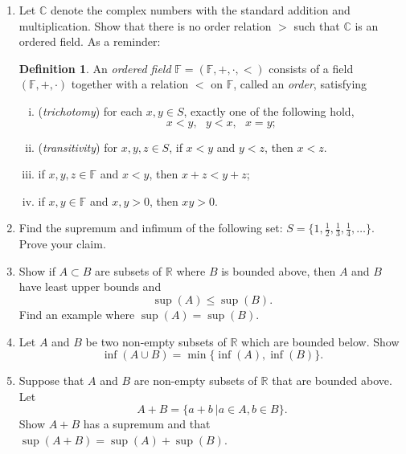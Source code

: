 \documentclass[12pt,letterpaper]{article}
\theoremstyle{plain}
\theoremstyle{definition}
\newtheorem{definition}[theorem]{Definition}
\begin{document}
\begin{enumerate}[1.]
 \item Let $\mathbb{C}$ denote the complex numbers with the standard addition and multiplication. Show that there is no order relation $>$ such that $\mathbb{C}$ is an ordered field. As a reminder:
 \begin{definition}\rm
   An {\it ordered field} $\mathbb{F}=(\mathbb{F},+,\cdot,<)$ consists
   of a field $(\mathbb{F},+,\cdot)$ together with a relation $<$ on $\mathbb{F}$, called
  an \emph{order}, satisfying
  \begin{enumerate}[(i)]
  \item (\emph{trichotomy}) for each $x,y\in S$, exactly one of the following hold,
 $$
   x<y, \ \ \ y<x, \ \ \ x=y;
 $$
  \item (\emph{transitivity}) for $x,y,z\in S$, 
   if $x<y$ and $y<z$, then $x<z$.
   \item if $x,y,z\in \mathbb{F}$ and $x<y$, then $x+z<y+z$;
   \item if $x,y\in \mathbb{F}$ and $x,y>0$, then $xy>0$.
  \end{enumerate} 
\end{definition} 
 \item Find the supremum and infimum of the following set: $S=\{1,\frac{1}{2}, \frac{1}{3},\frac{1}{4},\ldots\}$. Prove your claim. 
\item Show if $A\subset B$ are subsets of $\mathbb{R}$ where $B$ is bounded above, then $A$ and $B$ have least upper bounds and 
\[\sup(A)\leq \sup(B).\]
Find an example where $\sup(A)=\sup(B)$.  
 \item Let $A$ and $B$ be two non-empty subsets of $\mathbb{R}$ which are bounded below. 
 Show \[\inf(A\cup B)=\min\{\inf(A),\inf(B)\}.\]
\item Suppose that $A$ and $B$ are non-empty subsets of $\mathbb{R}$ that are bounded above. Let 
\[A+B=\{a+b\ | a\in A, b\in B\}.\]
Show $A+B$ has a supremum and that $\sup(A+B)=\sup(A)+\sup(B)$. 


 \end{enumerate}
\end{document}
